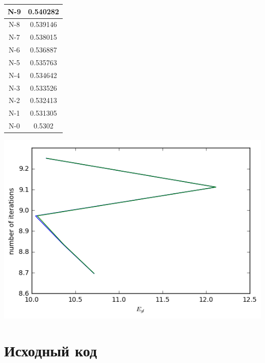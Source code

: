 \documentclass[10pt,a4paper,oneside,russian]{article}
\begin{document}
\begin{enumerate}
\begin{tabular}{|c|c|}
    N-9&0.540282\\ \hline
    N-8&0.539146\\ \hline
    N-7&0.538015\\ \hline
    N-6&0.536887\\ \hline
    N-5&0.535763\\ \hline
    N-4&0.534642\\ \hline
    N-3&0.533526\\ \hline
    N-2&0.532413\\ \hline
    N-1&0.531305\\ \hline
    N-0&0.5302\\ \hline
  \end{tabular}

  \begin{center}
    \includegraphics[scale=0.60]{errors-plot.png}
  \end{center}
\end{enumerate}

\section{Исходный код}

\end{document}
